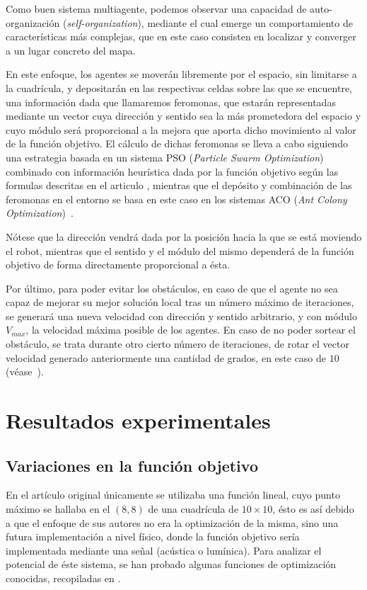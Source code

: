\documentclass[runningheads]{llncs}
\begin{document}
    Como buen sistema multiagente, podemos observar una capacidad de auto-organización (\textit{self-organization}), mediante el cual emerge un comportamiento de características más complejas, que en este caso consisten en localizar y converger a un lugar concreto del mapa.

    En este enfoque, los agentes se moverán libremente por el espacio, sin limitarse a la cuadrícula, y depositarán en las respectivas celdas sobre las que se encuentre, una información dada que llamaremos feromonas, que estarán representadas mediante un vector cuya dirección y sentido sea la más prometedora del espacio y cuyo módulo será proporcional a la mejora que aporta dicho movimiento al valor de la función objetivo. El cálculo de dichas feromonas se lleva a cabo siguiendo una estrategia basada en un sistema PSO (\textit{Particle Swarm Optimization})~\cite{PSO} combinado con información heurística dada por la función objetivo según las formulas descritas en el articulo \cite{initialPaper}, mientras que el depósito y combinación de las feromonas en el entorno se basa en este caso en los sistemas ACO (\textit{Ant Colony Optimization})~\cite{ACO}.
    
    Nótese que la dirección vendrá dada por la posición hacia la que se está moviendo el robot, mientras que el sentido y el módulo del mismo dependerá de la función objetivo de forma directamente proporcional a ésta.

    Por último, para poder evitar los obstáculos, en caso de que el agente no sea capaz de mejorar su mejor solución local tras un número máximo de iteraciones, se generará una nueva velocidad con dirección y sentido arbitrario, y con módulo $V_{max}$, la velocidad máxima posible de los agentes. En caso de no poder sortear el obstáculo, se trata durante otro cierto número de iteraciones, de rotar el vector velocidad generado anteriormente una cantidad de grados, en este caso de $10$ (véase~\cite{referencedPaper}).


    \section{Resultados experimentales}



    \subsection{Variaciones en la función objetivo}
    En el artículo original \cite{initialPaper} únicamente se utilizaba una función lineal, cuyo punto máximo se hallaba en el $(8,8)$ de una cuadrícula de $10\times10$, ésto es así debido a que el enfoque de sus autores no era la optimización de la misma, sino una futura implementación a nivel físico, donde la función objetivo sería implementada mediante una señal (acústica o lumínica). Para analizar el potencial de éste sistema, se han probado algunas funciones de optimización conocidas, recopiladas en \cite{WebFuncionesOptimizacion}.
\end{document}
